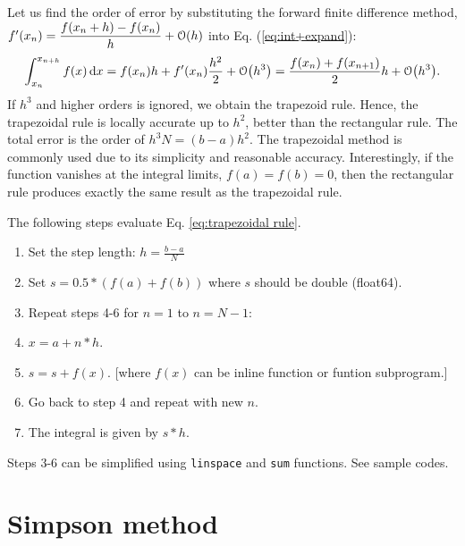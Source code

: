 Let us find the order of error by substituting the forward finite difference method, $f'(x_n) = \displaystyle\frac{f(x_n+h)-f(x_n)}{h}+\order{h}$ into Eq. (\ref{eq:int+expand}):
\begin{equation}\label{eq:error_trapezoid} 
\int_{x_{n}}^{x_{n+h}} f(x) \dd{x} = f(x_n) h + f'(x_n)\frac{h^2}{2} + \order{h^3} = \frac{f(x_n)+f(x_{n+1})}{2} h + \order{h^3}.
\end{equation}
If $h^3$ and higher orders is ignored, we obtain the trapezoid rule.  Hence, the trapezoidal rule is locally accurate up to $h^2$, better than the rectangular rule.  The total error is the order of $h^3 N =(b-a) h^2$.  The trapezoidal method is commonly used due to its simplicity and reasonable accuracy. Interestingly, if the function vanishes at the integral limits, $f(a)=f(b)=0$, then the rectangular rule produces exactly the same result as the trapezoidal rule.

\begin{myalgobox}
    \label{algo:trapezoidal rule}
    
    \medskip
    The following steps evaluate Eq. \ref{eq:trapezoidal rule}.
    
    \medskip
    \begin{enumerate}
        \item Set the step length: $h=\displaystyle\frac{b-a}{N}$
        \item Set $s=0.5*(f(a)+f(b))$ where $s$ should be double (float64).
        \item Repeat steps 4-6 for $n=1$ to $n=N-1$:
        \item $x=a+n*h$.
        \item $s=s+f(x)$.  [where $f(x)$ can be inline function or funtion subprogram.]
        \item Go back to step 4 and repeat with new $n$.
        \item The integral is given by $s*h$.
    \end{enumerate}

\bigskip
    Steps 3-6 can be simplified using \texttt{linspace} and \texttt{sum} functions. See sample codes.
\end{myalgobox}



\section{Simpson method}

